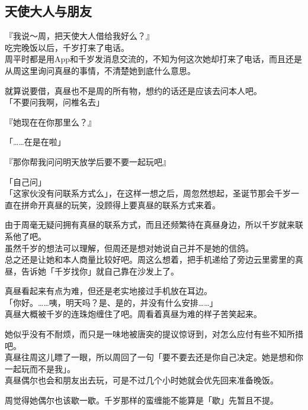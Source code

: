 \subsection{天使大人与朋友}

『我说～周，把天使大人借给我好么？』\\

吃完晚饭以后，千岁打来了电话。\\

周平时都是用App和千岁发消息交流的，不知为何这次她却打来了电话，而且还是从周这里询问真昼的事情，不清楚她到底什么意思。

就算说要借，真昼也不是周的所有物，想约的话还是应该去问本人吧。\\

「不要问我啊，问椎名去」

『她现在在你那里么？』

「……在是在啦」

『那你帮我问问明天放学后要不要一起玩吧』

「自己问」\\

「这家伙没有问联系方式么」，在这样一想之后，周忽然想起，圣诞节那会千岁一直在拼命开真昼的玩笑，没顾得上要真昼的联系方式来着。

由于周毫无疑问拥有真昼的联系方式，而且还频繁待在真昼身边，所以千岁就来联系他了吧。\\

虽然千岁的想法可以理解，但周还是想对她说自己并不是她的信鸽。\\

总之还是让她和本人商量比较好吧。周这么想着，把手机递给了旁边云里雾里的真昼，告诉她「千岁找你」就自己靠在沙发上了。

真昼看起来有点为难，但还是老实地接过手机放在耳边。\\

「你好。……咦，明天吗？是、是的，并没有什么安排……」\\

真昼大概被千岁的连珠炮缠住了吧。周看着真昼为难的样子苦笑起来。

她似乎没有不耐烦，而只是一味地被唐突的提议惊讶到，对怎么应付有些不知所措吧。\\

真昼往周这儿瞟了一眼，所以周回了一句「要不要去还是你自己决定。她是想和你一起玩而不是我」。\\

真昼偶尔也会和朋友出去玩，可是不过几个小时她就会优先回来准备晚饭。

周觉得她偶尔也该歇一歇。千岁那样的蛮缠能不能算是「歇」先暂且不提。\\

